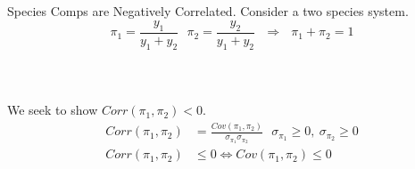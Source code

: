 \documentclass[ xcolor = pdftex, dvipsnames, table ]{beamer}
\begin{document}
\subsection{}
\begin{frame}{Species Comps are Negatively Correlated.}
	Consider a two species system. 
	\begin{equation*}
	\pi_1=\frac{y_1}{y_1+y_2} ~~~ \pi_2=\frac{y_2}{y_1+y_2} ~~~ \Rightarrow ~~~ \pi_1+\pi_2=1
	\end{equation*}
	\\$~$\\$~$\\
	We seek to show $Corr(\pi_{1}, \pi_{2})<0$.
	\\
	\begin{align*}
		Corr(\pi_{1}, \pi_{2}) &= \frac{Cov(\pi_{1}, \pi_{2})}{\sigma_{\pi_{1}}\sigma_{\pi_{2}}} ~~~ \sigma_{\pi_{1}}\ge0,~ \sigma_{\pi_{2}}\ge0 \nonumber\\
		Corr(\pi_{1}, \pi_{2}) &\le 0 \iff Cov(\pi_{1}, \pi_{2}) \le 0 \nonumber\\\nonumber\\
	\end{align*}
\end{frame}

%
%
\end{document}

